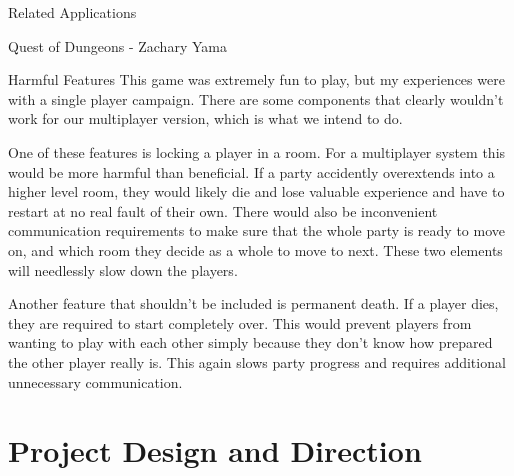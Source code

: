 \documentclass[12pt]{report}
\begin{document}
\begin{section}{Related Applications}
\begin{subsection}{Quest of Dungeons - Zachary Yama}
\begin{subsubsection}{Harmful Features}
This game was extremely fun to play, but my experiences were with a single
player campaign. There are some components that clearly wouldn’t work for
our multiplayer version, which is what we intend to do.
 
One of these features is locking a player in a room. For a multiplayer
system this would be more harmful than beneficial. If a party accidently
overextends into a higher level room, they would likely die and 
lose valuable experience and have to restart at no real fault of their own.
There would also be inconvenient communication requirements to make sure
that the whole party is ready to move on, and which room they decide as a
whole to move to next. These two elements will needlessly slow down the
players.
 
Another feature that shouldn’t be included is permanent death. If a player
dies, they are required to start completely over. This would prevent
players from wanting to play with each other simply because they don’t
know how prepared the other player really is. This again slows party
progress and requires additional unnecessary communication.
\end{subsubsection}
\end{subsection}
\end{section}

\chapter{Project Design and Direction}
\end{document}

